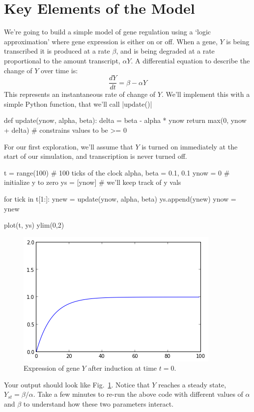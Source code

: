 
\section{Key Elements of the Model}


We're going to build a simple model of gene regulation using a `logic approximation' where gene expression is either on or off.  When a gene, $Y$ is being transcribed it is produced at a rate $\beta$, and is being degraded at a rate proportional to the amount transcript, $\alpha Y$. A differential equation to describe the change of $Y$ over time is:
\[
\frac{dY}{dt} = \beta - \alpha Y
\]
%
This represents an instantaneous rate of change of $Y$. We'll implement this with a simple Python function, that we'll call |update()|
%
\begin{python}
def update(ynow, alpha, beta):
    delta = beta - alpha * ynow
    return max(0, ynow + delta) # constrains values to be >= 0
\end{python}
%

For our first exploration, we'll assume that $Y$ is turned on immediately at the start of our simulation, and transcription is never turned off.
%
\begin{python}
t = range(100)  # 100 ticks of the clock
alpha, beta = 0.1, 0.1
ynow = 0  # initialize y to zero
ys = [ynow] # we'll keep track of y vals

for tick in t[1:]:
    ynew = update(ynow, alpha, beta)
    ys.append(ynew)
    ynow = ynew

plot(t, ys)
ylim(0,2)
\end{python}
%
\begin{figure}[!ht]
    \centering
    \includegraphics[width=0.33\columnwidth]{./figures/hands-on12/fig-simpleon.png}
    \caption{Expression of gene $Y$ after induction at time $t=0$.}\label{fig:simpleon}
\end{figure}
%
Your output should look like Fig.~\ref{fig:simpleon}. Notice that $Y$ reaches a steady state, $Y_{st} = \beta/\alpha$.  Take a few minutes to re-run the above code with different values of $\alpha$ and $\beta$ to understand how these two parameters interact.


